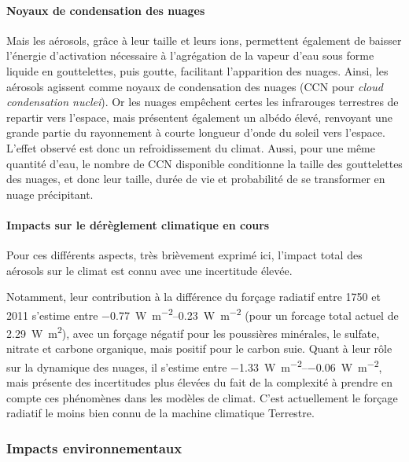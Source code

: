 \paragraph{Noyaux de condensation des nuages}%
\label{par:noyaux_de_condensation_des_nuages}

Mais les aérosols, grâce à leur taille et leurs ions, permettent également de baisser
l'énergie d'activation nécessaire à l'agrégation de la vapeur d'eau sous forme liquide en
gouttelettes, puis goutte, facilitant l'apparition des nuages. Ainsi, les aérosols agissent
comme noyaux de condensation des nuages (CCN pour \textit{cloud condensation nuclei}). Or
les nuages empêchent certes les infrarouges terrestres de repartir vers l'espace, mais
présentent également un albédo élevé, renvoyant une grande partie du rayonnement à courte
longueur d'onde du soleil vers l'espace. L'effet observé est donc un refroidissement du
climat.
Aussi, pour une même quantité d'eau, le nombre de CCN disponible conditionne la taille des
gouttelettes des nuages, et donc leur taille, durée de vie et probabilité de se
transformer en nuage précipitant.

\paragraph{Impacts sur le dérèglement climatique en cours}%
\label{par:impacts_sur_le_dereglement_climatique_en_cours}

Pour ces différents aspects, très brièvement exprimé ici, l'impact total des aérosols sur
le climat est connu avec une incertitude élevée. 

Notamment, leur contribution à la différence du forçage radiatif entre 1750 et 2011 s'estime entre
\SIrange[range-phrase=~et~]{-0.77}{0.23}{\W\per\m\squared} (pour un forcage total actuel
de \SI{2.29}{\W\m\squared}), avec un forçage négatif pour
les poussières minérales, le sulfate, nitrate et carbone organique, mais positif pour le
carbon suie.  Quant à leur rôle sur la dynamique des nuages, il s'estime entre
\SIrange[range-phrase=~et~]{-1.33}{-0.06}{\W\per\m\squared}, mais présente des
incertitudes plus élevées du fait de la complexité à prendre en compte ces phénomènes dans
les modèles de climat. C'est actuellement le forçage radiatif le moins bien connu de la
machine climatique Terrestre.

\subsubsection{Impacts environnementaux}%
\label{ssub:impacts_environnementaux}

